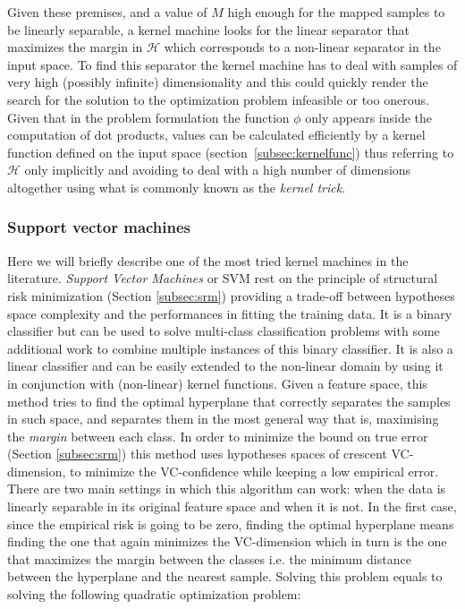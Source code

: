 Given these premises, and a value of $M$ high enough for the mapped samples to
be linearly separable, a kernel machine looks for the linear separator that maximizes
the margin in $\mathcal{H}$ which corresponds to a non-linear separator in the input space.
To find this separator the kernel machine has to deal with samples of
very high (possibly infinite) dimensionality and this could quickly render the
search for the solution to the optimization problem infeasible or too onerous.
Given that in the problem formulation the function $\phi$ only appears inside
the computation of dot products, values can be calculated efficiently by a kernel
function defined on the input space (section~\ref{subsec:kernelfunc}) thus referring to $\mathcal{H}$
only implicitly and avoiding to deal with a high number of dimensions
altogether using what is commonly known as the \emph{kernel trick}.

\subsubsection{Support vector machines}
\label{subsubsec:svm}
Here we will briefly describe one of the most tried kernel machines in the literature. 
\emph{Support Vector Machines} or SVM \cite{Cortes&Vapnik:1995} rest on the principle of structural risk
minimization (Section \ref{subsec:srm}) providing a trade-off between hypotheses
space complexity and the performances in fitting the training data.
It is a binary classifier but can be used to solve multi-class classification
problems with some additional work to combine multiple instances of this binary
classifier.
It is also a linear classifier and can be easily extended to the 
non-linear domain by using it in conjunction with (non-linear) kernel functions.
Given a feature space, this method tries to find the optimal hyperplane that
correctly separates the samples in such space, and separates them in the
most general way that is, maximising the \emph{margin} between each class.
In order to minimize the bound on true error (Section \ref{subsec:srm})
this method uses hypotheses spaces of crescent VC-dimension, to minimize the
VC-confidence while keeping a low empirical error.
There are two main settings in which this algorithm can work: when the data
is linearly separable in its original feature space and when it is not.
In the first case, since the empirical risk is going to be zero, finding the
optimal hyperplane means finding the one that again minimizes the VC-dimension
which in turn is the one that maximizes the margin between the classes i.e.
the minimum distance between the hyperplane and the nearest sample.
Solving this problem equals to solving the following quadratic optimization
problem:

